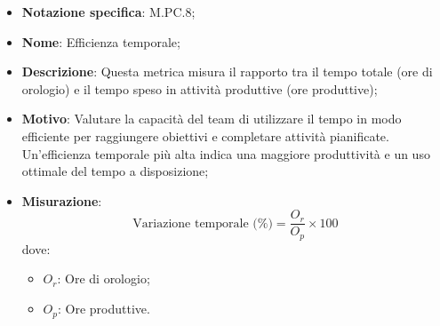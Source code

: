 \begin{itemize}
    \item \textbf{Notazione specifica}: M.PC.8;
    \item \textbf{Nome}: Efficienza temporale;
    \item \textbf{Descrizione}: Questa metrica misura il rapporto tra il tempo totale (ore di orologio) e il tempo speso in attività produttive (ore produttive);
    \item \textbf{Motivo}: Valutare la capacità del team di utilizzare il tempo in modo efficiente per raggiungere obiettivi e completare attività pianificate. Un'efficienza temporale più alta indica una maggiore produttività e un uso ottimale del tempo a disposizione;
    \item \textbf{Misurazione}:
    \[
        \text{Variazione temporale (\%)} =\frac{O_r}{O_p} \times 100
    \]
    dove:
    \begin{itemize}
        \item $O_{r}$: Ore di orologio;
        \item $O_{p}$: Ore produttive.
    \end{itemize}
\end{itemize}

